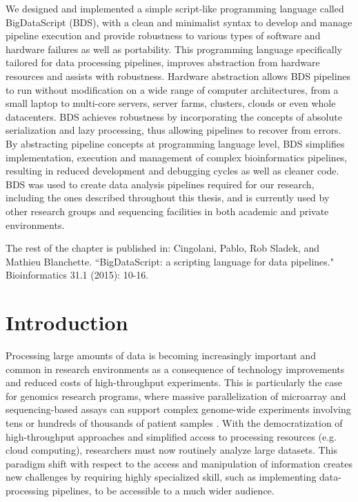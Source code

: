 We designed and implemented a simple script-like programming language called BigDataScript (BDS), with a clean and minimalist syntax to develop and manage pipeline execution and provide robustness to various types of software and hardware failures as well as portability.  This programming language specifically tailored for data processing pipelines, improves abstraction from hardware resources and assists with robustness. Hardware abstraction allows BDS pipelines to run without modification on a wide range of computer architectures, from a small laptop to multi-core servers, server farms, clusters, clouds or even whole datacenters. BDS achieves robustness by incorporating the concepts of absolute serialization and lazy processing, thus allowing pipelines to recover from errors. By abstracting pipeline concepts at programming language level, BDS simplifies implementation, execution and management of complex bioinformatics pipelines, resulting in reduced development and debugging cycles as well as cleaner code. BDS was used to create data analysis pipelines required for our research, including the ones described throughout this thesis, and is currently used by other research groups and  sequencing facilities in both academic and private environments.

The rest of the chapter is published in: Cingolani, Pablo, Rob Sladek, and Mathieu Blanchette. ``BigDataScript: a scripting language for data pipelines." Bioinformatics 31.1 (2015): 10-16.


\section{Introduction}

Processing large amounts of data is becoming increasingly important and common in research environments as a consequence of technology improvements and reduced costs of high-throughput experiments. This is particularly the case for genomics research programs, where massive parallelization of microarray and sequencing-based assays can support complex genome-wide experiments involving tens or hundreds of thousands of patient samples \cite{Zuk2014}. With the democratization of high-throughput approaches and simplified access to processing resources (e.g. cloud computing), researchers must now routinely analyze large datasets. This paradigm shift with respect to the access and manipulation of information creates new challenges by requiring highly specialized skill, such as implementing data-processing pipelines, to be accessible to a much wider audience.

